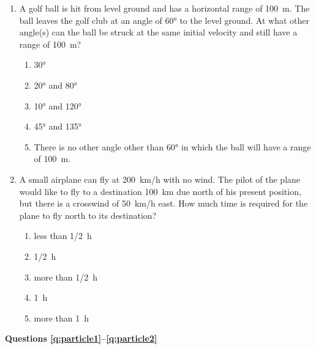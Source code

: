 \documentclass{../../../oss-apphys}
\begin{document}
\begin{multicols}{2}
\begin{enumerate}[resume,leftmargin=18pt]
  \item A golf ball is hit from level ground and has a horizontal range of
    \SI{100}{\metre}. The ball leaves the golf club at an angle of \ang{60} to
    the level ground. At what other angle(s) can the ball be struck at the same
    initial velocity and still have a range of \SI{100}{\metre}?
    \begin{center}
      \vspace{-.2in}
    \end{center}
    \begin{enumerate}[nosep,leftmargin=18pt,label=(\Alph*)]
    \item\ang{30}
    \item\ang{20} and \ang{80}
    \item\ang{10} and \ang{120}
    \item\ang{45} and \ang{135}
    \item There is no other angle other than \ang{60} in which the ball will
      have a range of \SI{100}{\metre}.
    \end{enumerate}
    
  \item A small airplane can fly at \SI{200}{km/h} with no wind. The pilot of
    the plane would like to fly to a destination \SI{100}{km} due north of his
    present position, but there is a crosswind of \SI{50}{km/h} east. How much
    time is required for the plane to fly north to its destination?
    \begin{enumerate}[nosep,leftmargin=18pt,label=(\Alph*)]
    \item less than \SI{1/2}{\hour}
    \item \SI{1/2}{\hour}
    \item more than \SI{1/2}{\hour}
    \item \SI{1}{\hour}
    \item more than \SI{1}{\hour}
    \end{enumerate}
    
  \end{enumerate}
  \columnbreak
  
  \textbf{Questions \ref{q:particle1}--\ref{q:particle2}}


\end{multicols}
\end{document}
